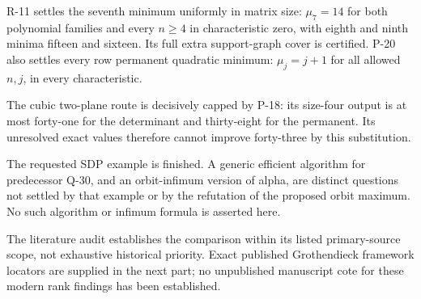 R-11 settles the seventh minimum uniformly in matrix size:
$\mu_7=14$ for both polynomial families and every $n\geq4$
in characteristic zero, with eighth and ninth minima fifteen
and sixteen. Its full extra support-graph cover is certified.
P-20 also settles every row permanent quadratic minimum:
$\mu_j=j+1$ for all allowed $n,j$, in every characteristic.

The cubic two-plane route is decisively capped by P-18:
its size-four output is at most forty-one for the determinant
and thirty-eight for the permanent. Its unresolved exact values
therefore cannot improve forty-three by this substitution.

The requested SDP example is finished. A generic efficient
algorithm for predecessor Q-30, and an orbit-infimum version of
alpha, are distinct questions not settled by that example or by
the refutation of the proposed orbit maximum. No such algorithm
or infimum formula is asserted here.

The literature audit establishes the comparison within its listed
primary-source scope, not exhaustive historical priority. Exact
published Grothendieck framework locators are supplied in the
next part; no unpublished manuscript cote for these modern rank
findings has been established.
